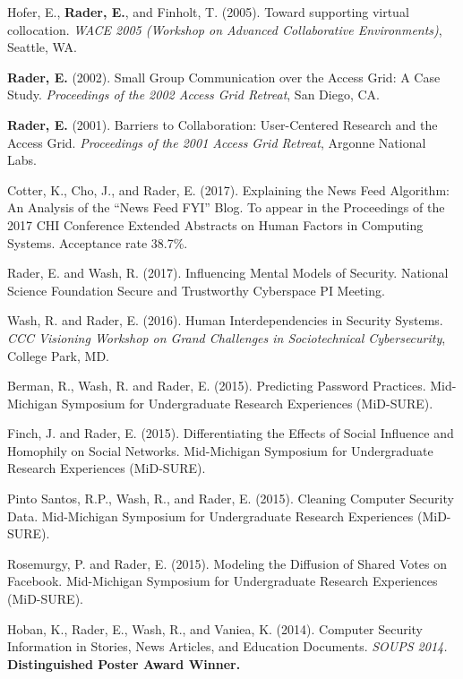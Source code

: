 \documentclass[9pt]{extarticle}
\makeatletter
\renewcommand{\section}{%
  \@startsection{section}{1}{0em}{\baselineskip}{3pt}{\large\bfseries\textsc}}
\makeatother
\begin{document}
Hofer, E., \textbf{Rader, E.}, and Finholt, T. (2005). Toward supporting virtual collocation. \emph{WACE 2005 (Workshop on Advanced Collaborative Environments)}, Seattle, WA.

\newpage
\textbf{Rader, E.} (2002). Small Group Communication over the Access Grid: A Case Study. \emph{Proceedings of the 2002 Access Grid Retreat}, San Diego, CA.

\textbf{Rader, E.} (2001). Barriers to Collaboration: User-Centered Research and the Access Grid. \emph{Proceedings of the 2001 Access Grid Retreat}, Argonne National Labs.


\section{Extended Abstracts and Posters}

Cotter, K., Cho, J., and Rader, E. (2017). Explaining the News Feed Algorithm: An Analysis of the ``News Feed FYI'' Blog. To appear in the Proceedings of the 2017 CHI Conference Extended Abstracts on Human Factors in Computing Systems. Acceptance rate 38.7\%.

Rader, E. and Wash, R. (2017). Influencing Mental Models of Security. National Science Foundation Secure and Trustworthy Cyberspace PI Meeting.

Wash, R. and Rader, E. (2016). Human Interdependencies in Security Systems. \emph{CCC Visioning Workshop on Grand Challenges in Sociotechnical Cybersecurity}, College Park, MD.

Berman, R., Wash, R. and Rader, E. (2015). Predicting Password Practices. Mid-Michigan Symposium for Undergraduate Research Experiences (MiD-SURE).

Finch, J. and Rader, E. (2015). Differentiating the Effects of Social Influence and Homophily on Social Networks. Mid-Michigan Symposium for Undergraduate Research Experiences (MiD-SURE).

Pinto Santos, R.P., Wash, R., and Rader, E. (2015). Cleaning Computer Security Data. Mid-Michigan Symposium for Undergraduate Research Experiences (MiD-SURE).

Rosemurgy, P. and Rader, E. (2015). Modeling the Diffusion of Shared Votes on Facebook. Mid-Michigan Symposium for Undergraduate Research Experiences (MiD-SURE).

Hoban, K., Rader, E., Wash, R., and Vaniea, K. (2014). Computer Security Information in Stories, News Articles, and Education Documents. \emph{SOUPS 2014.} \textbf{Distinguished Poster Award Winner.}
\end{document}
